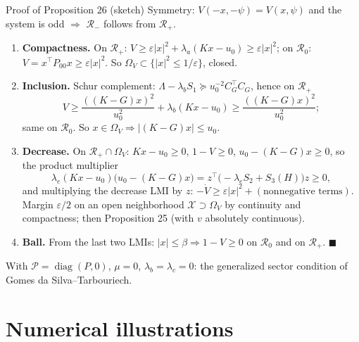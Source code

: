\documentclass[10pt,aspectratio=169]{beamer}
\newcommand{\tr}{^{\top}}
\newcommand{\PP}{\mathcal{P}}
\DeclareMathOperator{\diag}{diag}
\begin{document}
\begin{frame}{Proof of Proposition 26 (sketch)}
Symmetry: $V(-x,-\psi)=V(x,\psi)$ and the system is odd $\Rightarrow$ $\mathcal R_-$ follows from $\mathcal R_+$.
\begin{enumerate}
\item \textbf{Compactness.} On $\mathcal R_+$: $V\ge\varepsilon|x|^2+\lambda_a(Kx-u_0)\ge\varepsilon|x|^2$; on $\mathcal R_0$: $V=x\tr P_{00}x\ge\varepsilon|x|^2$. So $\Omega_V\subset\{|x|^2\le1/\varepsilon\}$, closed.
\item \textbf{Inclusion.} Schur complement: $\Lambda-\lambda_bS_1\succeq u_0^{-2}C_G\tr C_G$, hence on $\mathcal R_+$
\[
V\ge\frac{((K-G)x)^2}{u_0^2}+\lambda_b(Kx-u_0)\ge\frac{((K-G)x)^2}{u_0^2};
\]
same on $\mathcal R_0$. So $x\in\Omega_V\Rightarrow|(K-G)x|\le u_0$.
\item \textbf{Decrease.} On $\mathcal R_+\cap\Omega_V$: $Kx-u_0\ge0$, $1-V\ge0$, $u_0-(K-G)x\ge0$, so the product multiplier
\[
\lambda_e(Kx-u_0)\big(u_0-(K-G)x\big)=z\tr\big(-\lambda_eS_2+S_3(H)\big)z\ge0 ,
\]
and multiplying the decrease LMI by $z$: $-\dot V\ge\varepsilon|x|^2+(\text{nonnegative terms})$. Margin $\varepsilon/2$ on an open neighborhood $\mathcal X\supset\Omega_V$ by continuity and compactness; then Proposition 25 (with $v$ absolutely continuous).
\item \textbf{Ball.} From the last two LMIs: $|x|\le\beta\Rightarrow1-V\ge0$ on $\mathcal R_0$ and on $\mathcal R_+$. $\blacksquare$
\end{enumerate}
\medskip
With $\PP=\diag(P,0)$, $\mu=0$, $\lambda_b=\lambda_c=0$: the generalized sector condition of Gomes da Silva--Tarbouriech.
\end{frame}

\section{Numerical illustrations}
\end{document}
